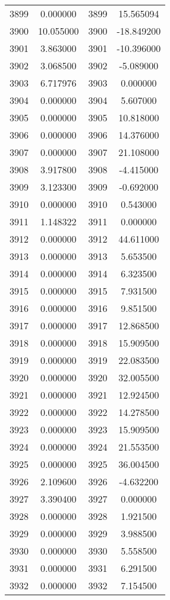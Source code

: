 \documentclass[12pt]{article}
\begin{document}
\begin{longtable}{@{}cccc@{}}
3899 & 0.000000 & 3899 & 15.565094 \\
3900 & 10.055000 & 3900 & -18.849200 \\
3901 & 3.863000 & 3901 & -10.396000 \\
3902 & 3.068500 & 3902 & -5.089000 \\
3903 & 6.717976 & 3903 & 0.000000 \\
3904 & 0.000000 & 3904 & 5.607000 \\
3905 & 0.000000 & 3905 & 10.818000 \\
3906 & 0.000000 & 3906 & 14.376000 \\
3907 & 0.000000 & 3907 & 21.108000 \\
3908 & 3.917800 & 3908 & -4.415000 \\
3909 & 3.123300 & 3909 & -0.692000 \\
3910 & 0.000000 & 3910 & 0.543000 \\
3911 & 1.148322 & 3911 & 0.000000 \\
3912 & 0.000000 & 3912 & 44.611000 \\
3913 & 0.000000 & 3913 & 5.653500 \\
3914 & 0.000000 & 3914 & 6.323500 \\
3915 & 0.000000 & 3915 & 7.931500 \\
3916 & 0.000000 & 3916 & 9.851500 \\
3917 & 0.000000 & 3917 & 12.868500 \\
3918 & 0.000000 & 3918 & 15.909500 \\
3919 & 0.000000 & 3919 & 22.083500 \\
3920 & 0.000000 & 3920 & 32.005500 \\
3921 & 0.000000 & 3921 & 12.924500 \\
3922 & 0.000000 & 3922 & 14.278500 \\
3923 & 0.000000 & 3923 & 15.909500 \\
3924 & 0.000000 & 3924 & 21.553500 \\
3925 & 0.000000 & 3925 & 36.004500 \\
3926 & 2.109600 & 3926 & -4.632200 \\
3927 & 3.390400 & 3927 & 0.000000 \\
3928 & 0.000000 & 3928 & 1.921500 \\
3929 & 0.000000 & 3929 & 3.988500 \\
3930 & 0.000000 & 3930 & 5.558500 \\
3931 & 0.000000 & 3931 & 6.291500 \\
3932 & 0.000000 & 3932 & 7.154500 \\

\end{longtable}
\end{document}
